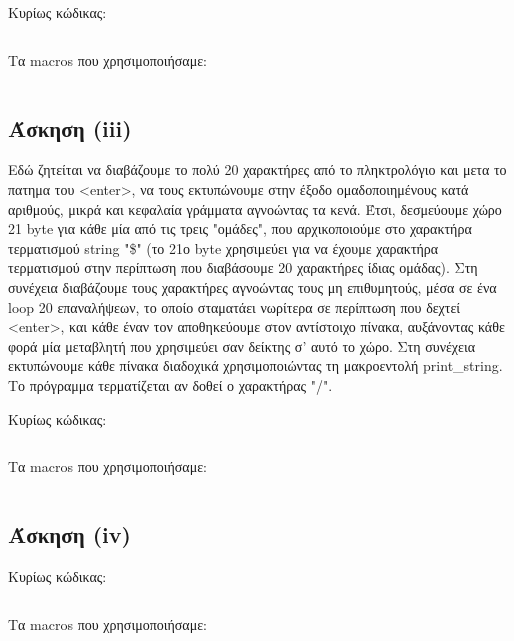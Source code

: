 \documentclass[a4paper,10pt]{article} \usepackage{anysize}
\begin{document}
\noindent Κυρίως κώδικας:
\inputminted[linenos,obeytabs,fontsize=\footnotesize]{nasm}{files/2.asm}
Τα macros που χρησιμοποιήσαμε:
\inputminted[linenos,obeytabs,fontsize=\footnotesize]{nasm}{files/2.txt}
\subsection*{Άσκηση (iii)}
Εδώ ζητείται να διαβάζουμε το πολύ 20 χαρακτήρες από το πληκτρολόγιο
και μετα το πατημα του <enter>, να τους εκτυπώνουμε
στην έξοδο ομαδοποιημένους κατά αριθμούς, μικρά και κεφαλαία γράμματα
αγνοώντας τα κενά. Έτσι, δεσμεύουμε χώρο 21 byte για κάθε μία από τις τρεις
"ομάδες", που αρχικοποιούμε στο χαρακτήρα τερματισμού string "\$" (το 21ο byte
χρησιμεύει για να έχουμε χαρακτήρα τερματισμού στην περίπτωση που διαβάσουμε
20 χαρακτήρες ίδιας ομάδας).  Στη συνέχεια διαβάζουμε τους χαρακτήρες
αγνοώντας τους μη επιθυμητούς, μέσα σε ένα loop 20 επαναλήψεων, 
το οποίο σταματάει νωρίτερα σε περίπτωση που δεχτεί <enter>, 
και κάθε έναν τον αποθηκεύουμε στον αντίστοιχο πίνακα,
αυξάνοντας κάθε φορά μία μεταβλητή που χρησιμεύει σαν δείκτης σ' αυτό το χώρο.
Στη συνέχεια εκτυπώνουμε κάθε πίνακα διαδοχικά χρησιμοποιώντας τη
μακροεντολή print\_string. Το πρόγραμμα τερματίζεται αν δοθεί ο χαρακτήρας "/".

\noindent Κυρίως κώδικας:
\inputminted[linenos,obeytabs,fontsize=\footnotesize]{nasm}{files/3.asm}
Τα macros που χρησιμοποιήσαμε:
\inputminted[linenos,obeytabs,fontsize=\footnotesize]{nasm}{files/3.txt}
\subsection*{Άσκηση (iv)}
Κυρίως κώδικας:
\inputminted[linenos,obeytabs,fontsize=\footnotesize]{nasm}{files/4.asm}
Τα macros που χρησιμοποιήσαμε:
\inputminted[linenos,obeytabs,fontsize=\footnotesize]{nasm}{files/4.txt}
\end{document}
